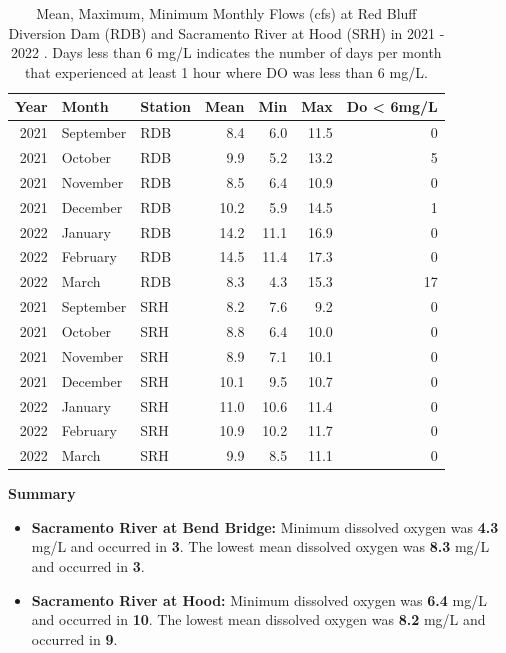 \documentclass[
]{book}
\providecommand{\tightlist}{%
  \setlength{\itemsep}{0pt}\setlength{\parskip}{0pt}}
\theoremstyle{definition}
\theoremstyle{definition}
\theoremstyle{definition}
\theoremstyle{definition}
\theoremstyle{remark}
\begin{document}
\begin{table}
\centering
\caption{Mean, Maximum, Minimum Monthly Flows (cfs) at Red Bluff Diversion Dam (RDB) and Sacramento River at Hood (SRH) in 2021 - 2022 . Days less than 6 mg/L indicates the number of days per month that experienced at least 1 hour where DO was less than 6 mg/L.}
\centering
\begin{tabular}[t]{rllrrrr}
\hline
Year & Month & Station & Mean & Min & Max & Do < 6mg/L\\
\hline
2021 & September & RDB & 8.4 & 6.0 & 11.5 & 0\\
\hline
2021 & October & RDB & 9.9 & 5.2 & 13.2 & 5\\
\hline
2021 & November & RDB & 8.5 & 6.4 & 10.9 & 0\\
\hline
2021 & December & RDB & 10.2 & 5.9 & 14.5 & 1\\
\hline
2022 & January & RDB & 14.2 & 11.1 & 16.9 & 0\\
\hline
2022 & February & RDB & 14.5 & 11.4 & 17.3 & 0\\
\hline
2022 & March & RDB & 8.3 & 4.3 & 15.3 & 17\\
\hline
2021 & September & SRH & 8.2 & 7.6 & 9.2 & 0\\
\hline
2021 & October & SRH & 8.8 & 6.4 & 10.0 & 0\\
\hline
2021 & November & SRH & 8.9 & 7.1 & 10.1 & 0\\
\hline
2021 & December & SRH & 10.1 & 9.5 & 10.7 & 0\\
\hline
2022 & January & SRH & 11.0 & 10.6 & 11.4 & 0\\
\hline
2022 & February & SRH & 10.9 & 10.2 & 11.7 & 0\\
\hline
2022 & March & SRH & 9.9 & 8.5 & 11.1 & 0\\
\hline
\end{tabular}
\end{table}

\textbf{Summary}

\begin{itemize}
\tightlist
\item
  \textbf{Sacramento River at Bend Bridge:} Minimum dissolved oxygen was \textbf{4.3} mg/L and occurred in \textbf{3}. The lowest mean dissolved oxygen was \textbf{8.3} mg/L and occurred in \textbf{3}.
\item
  \textbf{Sacramento River at Hood:} Minimum dissolved oxygen was \textbf{6.4} mg/L and occurred in \textbf{10}. The lowest mean dissolved oxygen was \textbf{8.2} mg/L and occurred in \textbf{9}.
\end{itemize}
\end{document}
